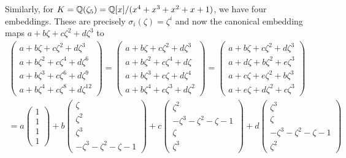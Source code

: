 \begin{example}
		Similarly, for $K = \mathbb{Q}(\zeta_5) = \mathbb{Q}[x]/(x^4 +x^3 +x^2+x +1)$, we have four embeddings. These are precisely $\sigma_i(\zeta) = \zeta^i$ and now the canonical embedding maps $a + b\zeta + c\zeta^2 + d\zeta^3$ to
	\begin{align*}
		\begin{pmatrix}
		a + b\zeta + c\zeta^2 +d \zeta^3 \\
		a + b\zeta^2 + c\zeta^4 +d \zeta^6 \\
		a + b\zeta^3 + c\zeta^6 +d \zeta^9 \\
		a + b\zeta^4 + c\zeta^8 +d \zeta^{12}
		\end{pmatrix} = \begin{pmatrix}
		a + b\zeta + c\zeta^2 + d\zeta^3 \\
		a + b\zeta^2 + c\zeta^4 + d\zeta \\ 
		a + b\zeta^3 + c\zeta + d\zeta^4 \\
		a + b\zeta^4 + c\zeta^3 + d\zeta^2
		\end{pmatrix} =
		\begin{pmatrix}
		a + b\zeta + c\zeta^2 + d\zeta^3 \\
		a + d\zeta + b\zeta^2 + e\zeta^3 \\
		a + c\zeta + e\zeta^2 + b\zeta^3  \\
		a + e\zeta + d\zeta^2 + c\zeta^3 
		\end{pmatrix} \\
		= a \begin{pmatrix} 1\\1\\1\\1 \end{pmatrix}
		+ b \begin{pmatrix} \zeta \\ \zeta^2\\ \zeta^3\\-\zeta^3-\zeta^2-\zeta-1 \end{pmatrix}
		+ c \begin{pmatrix} \zeta^2 \\-\zeta^3-\zeta^2-\zeta-1\\ \zeta \\ \zeta^3 \end{pmatrix}
		+ d \begin{pmatrix} \zeta^3 \\ \zeta \\-\zeta^3-\zeta^2-\zeta-1\\\zeta^2 \end{pmatrix}
	\end{align*}
\end{example}

